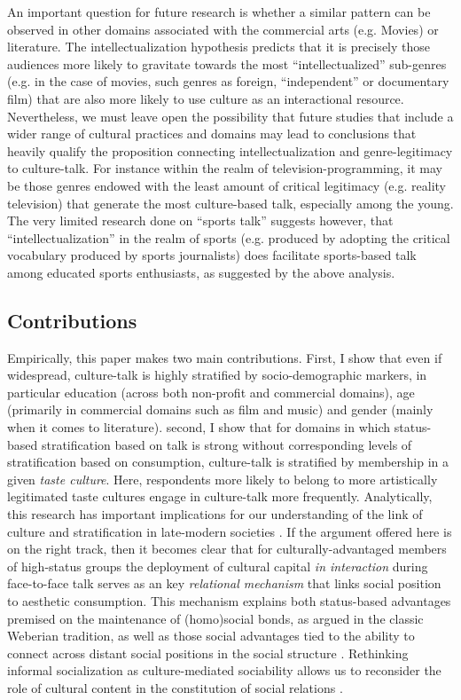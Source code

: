 An important question for future research is whether a similar pattern can be observed in other domains associated with the commercial arts (e.g. Movies) or literature. The intellectualization hypothesis predicts that it is precisely those audiences more likely to gravitate towards the most ``intellectualized'' sub-genres (e.g.  in the case of movies, such genres as foreign, ``independent'' or documentary film) that are also more likely to use culture as an interactional resource.    Nevertheless, we must leave open the possibility that future studies that include a wider range of cultural practices and domains may lead to conclusions that heavily qualify the proposition connecting intellectualization and genre-legitimacy to culture-talk.  For instance within the realm of television-programming, it may be those genres endowed with the least amount of critical legitimacy (e.g. reality television) that generate the most culture-based talk, especially among the young.  The very limited research done on ``sports talk'' \citep{purcell07} suggests however, that ``intellectualization'' in the realm of sports (e.g. produced by adopting the critical vocabulary produced by sports journalists) does facilitate sports-based talk among educated sports enthusiasts, as suggested by the above analysis. 

\subsection{Contributions}
Empirically, this paper makes two main contributions.  First, I show that even if widespread, culture-talk is highly stratified by socio-demographic markers, in particular education (across both non-profit and commercial domains), age (primarily in commercial domains such as film and music) and gender (mainly when it comes to literature). second, I show that for domains in which status-based stratification based on talk is strong without corresponding levels of stratification based on consumption, culture-talk is stratified by membership in a given \emph{taste culture}.  Here, respondents more likely to belong to more artistically legitimated taste cultures engage in culture-talk more frequently.  Analytically, this research has important implications for our understanding of the link of culture and stratification in late-modern societies \citep{ollivier00}.  If the argument offered here is on the right track, then it becomes clear that for culturally-advantaged members of high-status groups the deployment of cultural capital \emph{in interaction} \citep{eliasoph_lichterman03} during face-to-face talk serves as an key \emph{relational mechanism} \citep{tilly98} that links social position to aesthetic consumption.  This mechanism explains both status-based advantages premised on the maintenance of (homo)social bonds, as argued in the classic Weberian tradition, as well as those social advantages tied to the ability to connect across distant social positions in the social structure \citep{erickson96, lizardo06a, lin99, pachuki_breiger10}.   Rethinking informal socialization as culture-mediated sociability allows us to reconsider the role of cultural content in the constitution of social relations \citep{ikegami05, mische03, mische10}.  

